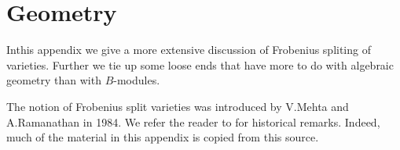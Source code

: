 \makeatletter

\def\@makechapterhead#1{%
  \vspace*{50\p@}%
  {\parindent \z@ \raggedright \normalfont
    \ifnum \c@secnumdepth >\m@ne
      \if@mainmatter
        \huge\bfseries Appendix\space \@Alph\thechapter
       \par\nobreak
        \vskip 20\p@
      \fi
    \fi
    \interlinepenalty\@M
    \Huge \bfseries #1 \par\nobreak
    \vskip 40\p@
  }}

\renewcommand\thesection{\@Alph\thechapter.\@arabic\c@section}

\def\@chapter[#1]#2{\ifnum \c@secnumdepth >\m@ne
                       \if@mainmatter
                         \refstepcounter{chapter}%
                         \typeout{\@chapapp\space\thechapter.}%
                         \addcontentsline{toc}{chapter}%
                                   {\protect\numberline{\@Alph\thechapter}
                         Appendix on #1}%
                       \else
                         \addcontentsline{toc}{chapter}{#1}%
                       \fi
                    \else
                      \addcontentsline{toc}{chapter}{#1}%
                    \fi
                    \chaptermark{#1}%
                    \addtocontents{lof}{\protect\addvspace{10\p@}}%
                    \addtocontents{lot}{\protect\addvspace{10\p@}}%
                    \if@twocolumn
                      \@topnewpage[\@makechapterhead{#2}]%
                    \else
                      \@makechapterhead{#2}%
                      \@afterheading
                    \fi}

\makeatother

\setcounter{chapter}{0}
\chapter{Geometry}\label{appndx-A}

In\pageoriginale this\label{page75} appendix we give a more extensive discussion of
Frobenius spliting of varieties. Further we tie up some loose ends
that have more to do with algebraic geometry than with $B$-modules.

The notion of Frobenius split varieties was introduced by V.\@ Mehta
and A.\@ Ramanathan in 1984. We refer the reader to \cite{key32} for
historical remarks. Indeed, much of the material in this appendix is
copied from this source.


